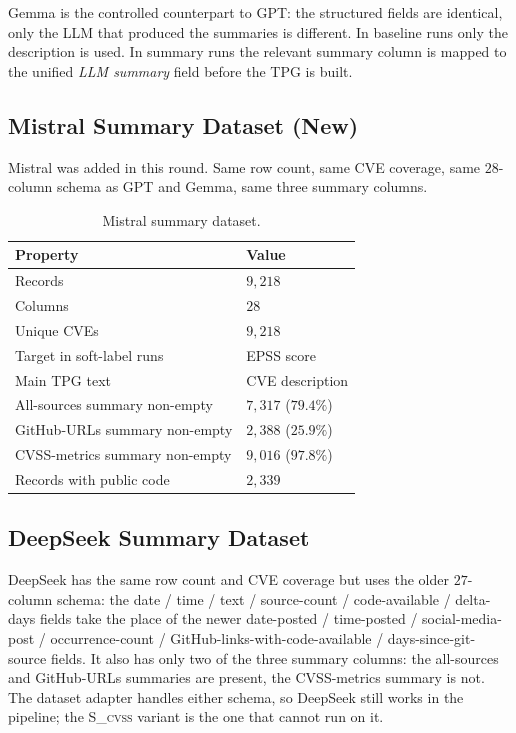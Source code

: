 \documentclass[11pt]{article}
\begin{document}
Gemma is the controlled counterpart to GPT: the structured fields are
identical, only the LLM that produced the summaries is different. In
baseline runs only the description is used. In summary runs the
relevant summary column is mapped to the unified \emph{LLM summary}
field before the TPG is built.

\subsection{Mistral Summary Dataset (New)}

Mistral was added in this round. Same row count, same CVE coverage,
same $28$-column schema as GPT and Gemma, same three summary columns.

\begin{table}[h]
\centering
\small
\begin{tabular}{ll}
\toprule
Property & Value \\
\midrule
Records & $9{,}218$ \\
Columns & $28$ \\
Unique CVEs & $9{,}218$ \\
Target in soft-label runs & EPSS score \\
Main TPG text & CVE description \\
All-sources summary non-empty & $7{,}317$ ($79.4\%$) \\
GitHub-URLs summary non-empty & $2{,}388$ ($25.9\%$) \\
CVSS-metrics summary non-empty & $9{,}016$ ($97.8\%$) \\
Records with public code & $2{,}339$ \\
\bottomrule
\end{tabular}
\caption{Mistral summary dataset.}
\end{table}

\subsection{DeepSeek Summary Dataset}

DeepSeek has the same row count and CVE coverage but uses the older
$27$-column schema: the date / time / text / source-count /
code-available / delta-days fields take the place of the newer
date-posted / time-posted / social-media-post / occurrence-count /
GitHub-links-with-code-available / days-since-git-source fields. It
also has only two of the three summary columns: the all-sources and
GitHub-URLs summaries are present, the CVSS-metrics summary is not.
The dataset adapter handles either schema, so DeepSeek still works in
the pipeline; the \textsc{S\_cvss} variant is the one that cannot run
on it.
\end{document}

